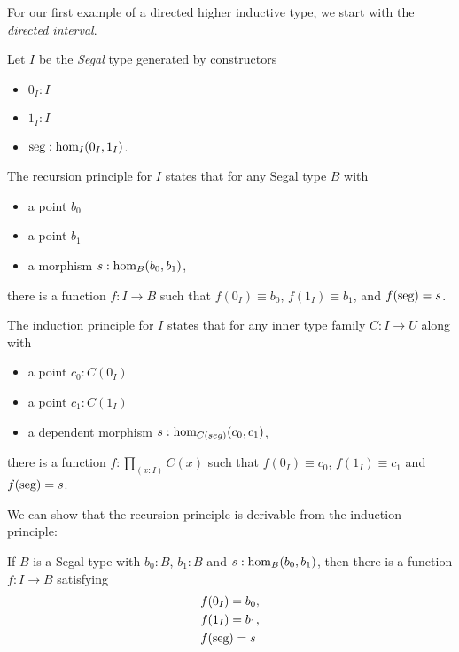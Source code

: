 \documentclass[main.tex]{subfiles}
\begin{document}
\noindent 
For our first example of a directed higher inductive type, we start with the \textit{directed interval}. 

 Let $I$ be the \textit{Segal} type generated by constructors

\begin{itemize}
    \item $0_I : I$
    \item $1_I : I$
    \item $\seg : \ho[I]{0_I}{1_I}$.
\end{itemize}


\noindent The recursion principle for $I$ states that for any Segal type $B$ with

\begin{itemize}
    \item a point $b_0$
    \item a point $b_1$
    \item a morphism $s : \ho[B]{b_0}{b_1}$,
\end{itemize}
there is a function $f : I \to B$ such that $f(0_I)\equiv b_0$, $f(1_I) \equiv b_1$, and $f(\seg) = s$. 

The induction principle for $I$ states that for any inner type family $C : I \to U$ along with 
\begin{itemize}
    \item a point $c_0 : C(0_I)$
    \item a point $c_1 : C(1_I)$
    \item a dependent morphism $s : \ho[C(seg)]{c_0}{c_1}$,
\end{itemize} 
there is a function $ f : \prod_{(x : I)} C(x)$ such that $f(0_I) \equiv c_0$, $f(1_I) \equiv c_1$ and $f(\seg) = s$. %


We can show that the recursion principle is derivable from the induction principle:
\begin{lemma}
 If $B$ is a Segal type with $b_0 : B$, $b_1 : B$ and $s : \ho[B]{b_0}{b_1}$, then there is a function $f : I \to B$ satisfying \begin{align*}
    &f(0_I) = b_0,\\ 
    &f(1_I) = b_1, \\  
    &f(\seg)=s
 \end{align*}
\end{lemma}
\end{document}

